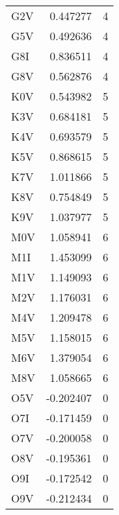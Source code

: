 \begin{tabular}{lrr}
 G2V &  0.447277 &           4 \\
 G5V &  0.492636 &           4 \\
 G8I &  0.836511 &           4 \\
 G8V &  0.562876 &           4 \\
 K0V &  0.543982 &           5 \\
 K3V &  0.684181 &           5 \\
 K4V &  0.693579 &           5 \\
 K5V &  0.868615 &           5 \\
 K7V &  1.011866 &           5 \\
 K8V &  0.754849 &           5 \\
 K9V &  1.037977 &           5 \\
 M0V &  1.058941 &           6 \\
 M1I &  1.453099 &           6 \\
 M1V &  1.149093 &           6 \\
 M2V &  1.176031 &           6 \\
 M4V &  1.209478 &           6 \\
 M5V &  1.158015 &           6 \\
 M6V &  1.379054 &           6 \\
 M8V &  1.058665 &           6 \\
 O5V & -0.202407 &           0 \\
 O7I & -0.171459 &           0 \\
 O7V & -0.200058 &           0 \\
 O8V & -0.195361 &           0 \\
 O9I & -0.172542 &           0 \\
 O9V & -0.212434 &           0 \\
\bottomrule
\end{tabular}
